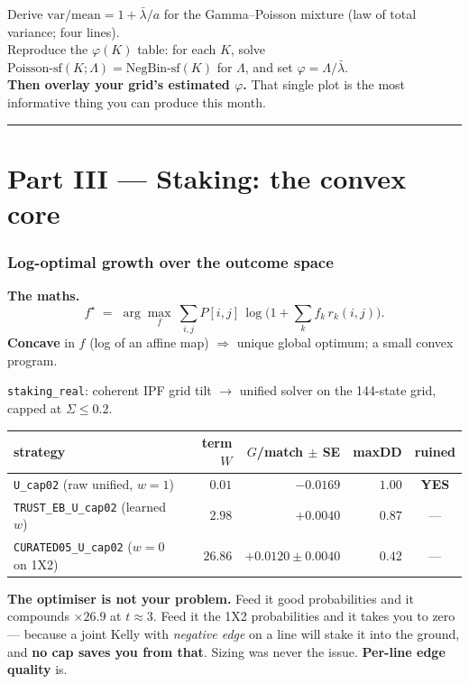 \documentclass[11pt,a4paper]{article}
\newcommand{\formula}[1]{\smallskip\noindent\textbf{\small The maths.}\ #1}
\begin{document}
\begin{exercise}
Derive $\mathrm{var}/\mathrm{mean} = 1 + \bar\lambda / a$ for the Gamma--Poisson mixture (law of total
variance; four lines). \\
Reproduce the $\varphi(K)$ table: for each $K$, solve
$\mathrm{Poisson\text{-}sf}(K;\Lambda) = \mathrm{NegBin\text{-}sf}(K)$ for $\Lambda$, and set
$\varphi = \Lambda/\bar\lambda$. \\
\textbf{Then overlay your grid's estimated $\varphi$.} That single plot is the most informative thing you can
produce this month.
\end{exercise}

\bigskip\hrule\bigskip

\part*{Part III --- Staking: the convex core}

\section{Log-optimal growth over the outcome space}

\formula{
\[
  f^\star \;=\; \arg\max_f\ \sum_{i,j} P[i,j]\,
  \log\!\Big(1 + \sum_k f_k\, r_k(i,j)\Big).
\]
\textbf{Concave} in $f$ (log of an affine map) $\Rightarrow$ unique global optimum; a small convex program.}

\begin{have}
\texttt{staking\_real}: coherent IPF grid tilt $\to$ unified solver on the 144-state grid, capped at
$\Sigma \le 0.2$.
\end{have}

\begin{tcolorbox}[enhanced, colback=warn!5, colframe=warn!60, boxrule=0.5pt, arc=1pt,
  fonttitle=\bfseries\sffamily\footnotesize, coltitle=warn, title={READ YOUR OWN RACE TABLE}]
\begin{center}
\begin{tabular}{@{}lrrrc@{}}
\toprule
strategy & term $W$ & $G$/match $\pm$ SE & maxDD & ruined \\
\midrule
\texttt{U\_cap02} (raw unified, $w{=}1$) & $\mathbf{0.01}$ & $-0.0169$ & $1.00$ & \textbf{YES} \\
\texttt{TRUST\_EB\_U\_cap02} (learned $w$) & $2.98$ & $+0.0040$ & $0.87$ & --- \\
\texttt{CURATED05\_U\_cap02} ($w{=}0$ on 1X2) & $\mathbf{26.86}$ & $\mathbf{+0.0120 \pm 0.0040}$ & $0.42$ & --- \\
\bottomrule
\end{tabular}
\end{center}
\textbf{The optimiser is not your problem.} Feed it good probabilities and it compounds $\times 26.9$ at
$t \approx 3$. Feed it the 1X2 probabilities and it takes you to zero --- because a joint Kelly with
\emph{negative edge} on a line will stake it into the ground, and \textbf{no cap saves you from that}.
Sizing was never the issue. \textbf{Per-line edge quality} is.
\end{tcolorbox}
\end{document}
